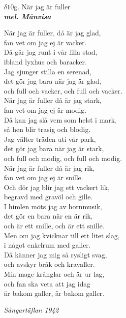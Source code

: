 \documentclass[a6paper,10pt]{article}
\newcommand{\mel}[1]{\small\textbf{\textit{mel. #1 \\}}}
\begin{document}
\newpage
\setlength{\oddsidemargin}{-0.47in}
\noindent
\begin{center}
\Large $\delta10$g. När jag är fuller\\ 
\mel{Månvisa}
\end{center}
När jag är fuller, då är jag glad, \\
fan vet om jag ej är vacker. \\
Då går jag runt i vår lilla stad, \\
ibland lyxhus och baracker. \\
Jag sjunger stilla en serenad, \\
det gör jag bara när jag är glad, \\
och full och vacker, och full och vacker. 
\vspace{5pt}\\
När jag är fuller då är jag stark, \\
fan vet om jag ej är modig. \\
Då kan jag slå vem som helst i mark, \\
så hen blir trasig och blodig. \\
Jag välter träden uti vår park, \\
det gör jag bara när jag är stark, \\
och full och modig, och full och modig. 
\vspace{5pt}\\
När jag är fuller då är jag rik, \\
fan vet om jag ej är snille. \\
Och dör jag blir jag ett vackert lik, \\
begravd med gravöl och gille. \\
I himlen möts jag av hornmusik, \\
det gör en bara när en är rik, \\
och är ett snille, och är ett snille.
\vspace{5pt}\\
Men om jag kvicknar till ett litet slag, \\
i något enkelrum med galler. \\
Då känner jag mig så rysligt svag, \\
och avskyr bråk och kravaller. \\
Min mage krånglar och är ur lag, \\
och fan ska veta att jag idag \\
är bakom galler, är bakom galler. 
\begin{flushright}
\textit{Sångartäflan 1942}
\end{flushright}
\end{document}
